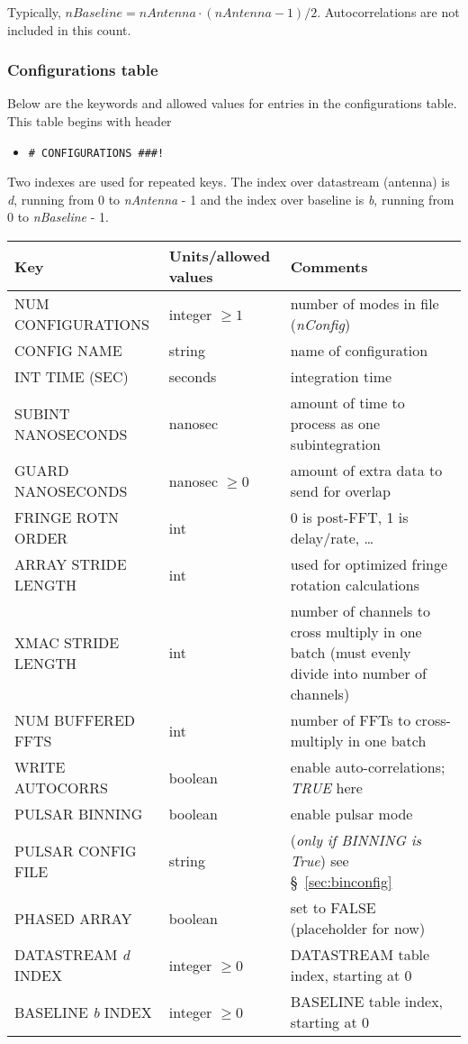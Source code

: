 Typically, $\mathit{nBaseline} = \mathit{nAntenna} \cdot (\mathit{nAntenna}-1)/2$.  Autocorrelations are not included in this count.

\subsubsection{Configurations table}

Below are the keywords and allowed values for entries in the configurations table.
This table begins with header 
\begin{itemize}
\item[] {\tt \verb+# CONFIGURATIONS ###!+}
\end{itemize}
Two indexes are used for repeated keys.  
The index over datastream (antenna) is {\em d}, running from 0 to {\em nAntenna} - 1 and the index over baseline is {\em b}, running from 0 to {\em nBaseline} - 1.

\begin{center}
\begin{tabular}{l l l}
\hline
Key & Units/allowed values & Comments \\
\hline
NUM CONFIGURATIONS & integer $\ge 1$ & number of modes in file ({\em nConfig}) \\
\hline
CONFIG NAME        & string & name of configuration \\
INT TIME (SEC)     & seconds & integration time \\
SUBINT NANOSECONDS & nanosec & amount of time to process as one subintegration \\
GUARD NANOSECONDS  & nanosec $\ge 0$ & amount of extra data to send for overlap \\
FRINGE ROTN ORDER  & int & 0 is post-FFT, 1 is delay/rate, \ldots \\
ARRAY STRIDE LENGTH & int & used for optimized fringe rotation calculations \\
XMAC STRIDE LENGTH  & int & number of channels to cross multiply in one batch (must evenly divide into number of channels) \\
NUM BUFFERED FFTS   & int & number of FFTs to cross-multiply in one batch \\
WRITE AUTOCORRS    & boolean & enable auto-correlations; {\em TRUE} here \\
PULSAR BINNING     & boolean & enable pulsar mode \\
PULSAR CONFIG FILE & string & ({\em only if BINNING is True}) see \S~\ref{sec:binconfig} \\
PHASED ARRAY       & boolean & set to FALSE (placeholder for now) \\
DATASTREAM {\em d} INDEX & integer $\ge 0$ & DATASTREAM table index, starting at 0 \\
BASELINE {\em b} INDEX   & integer $\ge 0$ & BASELINE table index, starting at 0 \\
\hline
\end{tabular}
\end{center}

